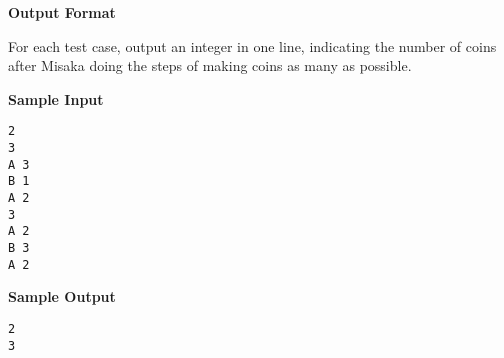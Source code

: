 \textbf{\large Output Format}

For each test case, output an integer in one line, indicating the number of
coins after Misaka doing the steps of making coins as many as possible.

\textbf{\large Sample Input}

\begin{verbatim}
2
3
A 3
B 1
A 2
3
A 2
B 3
A 2
\end{verbatim}

\textbf{\large Sample Output}

\begin{verbatim}
2
3
\end{verbatim}
